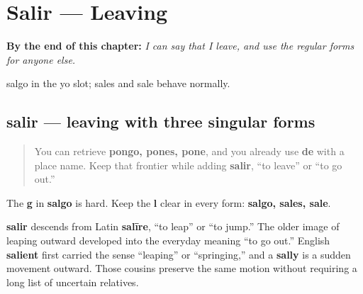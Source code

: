 
\chapter{Salir --- Leaving}
\label{ch:spanish-salir}

\begin{chapteropening}
\textbf{By the end of this chapter:} \emph{I can say that I leave, and use the regular forms for anyone else.}

salgo in the yo slot; sales and sale behave normally.
\end{chapteropening}

\section[salir]{salir — leaving with three singular forms}

\label{lesson:ES-C13-salir}



\begin{quote}
You can retrieve \textbf{pongo, pones, pone}, and you already use \textbf{de} with a place name. Keep that frontier while adding \textbf{salir}, “to leave” or “to go out.”
\end{quote}

\begin{sounds}
The \textbf{g} in \textbf{salgo} is hard. Keep the \textbf{l} clear in every form: \textbf{salgo, sales, sale}.
\end{sounds}

\begin{cousinweb}
\textbf{salir} descends from Latin \textbf{salīre}, “to leap” or “to jump.” The older image of leaping outward developed into the everyday meaning “to go out.” English \textbf{salient} first carried the sense “leaping” or “springing,” and a \textbf{sally} is a sudden movement outward. Those cousins preserve the same motion without requiring a long list of uncertain relatives.
\end{cousinweb}

